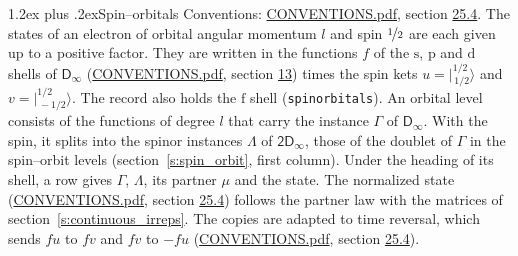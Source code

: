 \documentclass[10pt,a4paper]{article}
\makeatletter
\renewcommand\section{\@startsection{section}{1}{\z@}{-3ex plus -1ex minus -.2ex}%
  {1.2ex plus .2ex}{\normalfont\large\sffamily\bfseries\color{parttitle}}}
\numberwithin{equation}{section}
\newcommand{\grp}[1]{\mathsf{#1}}
\newcommand{\orbital}[1]{\mathrm{#1}}
\newcommand{\intx}{\mu}
\newcommand{\jm}[2]{\bigl\lvert{}^{#1}_{\,#2}\bigr\rangle}
\makeatother
\begin{document}
\section{Spin--orbitals}\label{s:spin_orbitals}
Conventions: \href{../../CONVENTIONS.pdf}{CONVENTIONS.pdf}, section \href{../../CONVENTIONS.pdf\#conv.25.4}{25.4}.
\leavevmode\label{n:index.orbital.l}The states of an electron of orbital angular momentum $l$ and spin $\nicefrac{1}{2}$ are each given up to a positive factor. \label{n:local.spinor.uv}\label{n:local.function.f}They are written in the functions $f$ of the $\orbital{s}$, $\orbital{p}$ and $\orbital{d}$ shells of \href{../../../rotation/data/pdf/Dinf.pdf}{$\grp{D_{\infty}}$} (\href{../../CONVENTIONS.pdf}{CONVENTIONS.pdf}, section \href{../../../rotation/CONVENTIONS.pdf\#conv.13}{13}) times the spin kets $u = \jm{1/2}{1/2}$ and $v = \jm{1/2}{-1/2}$. The record also holds the $\orbital{f}$ shell (\texttt{spinorbitals}). An orbital level consists of the functions of degree $l$ that carry the instance $\Gamma$ of \href{../../../rotation/data/pdf/Dinf.pdf}{$\grp{D_{\infty}}$}. With the spin, it splits into the spinor instances $\Lambda$ of $\grp{2D_{\infty }}$, those of the doublet of $\Gamma$ in the spin--orbit levels (section~\ref{s:spin_orbit}, first column). \label{n:head.state}Under the heading of its shell, a row gives $\Gamma$, $\Lambda$, its partner $\intx$ and the state. The normalized state (\href{../../CONVENTIONS.pdf}{CONVENTIONS.pdf}, section \href{../../CONVENTIONS.pdf\#conv.25.4}{25.4}) follows the partner law with the matrices of section~\ref{s:continuous_irreps}. The copies are adapted to time reversal, which sends $f u$ to $f v$ and $f v$ to $-f u$ (\href{../../CONVENTIONS.pdf}{CONVENTIONS.pdf}, section \href{../../CONVENTIONS.pdf\#conv.25.4}{25.4}).
\end{document}
